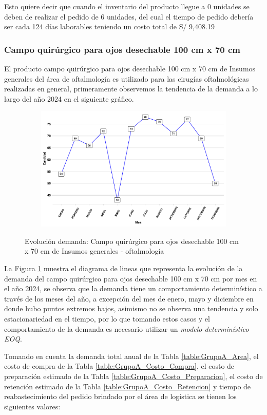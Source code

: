 Esto quiere decir que cuando el inventario del producto llegue a 0 unidades se deben de realizar el pedido de 6 unidades, del cual el tiempo de pedido debería ser cada 124 días laborables teniendo un costo total de S/ 9,408.19
\subsubsection{Campo quirúrgico para ojos desechable 100 cm x 70 cm}
El producto campo quirúrgico para ojos desechable 100 cm x 70 cm de Insumos generales del área de oftalmología es utilizado para las cirugías oftalmológicas realizadas en general, primeramente observemos la tendencia de la demanda a lo largo del año 2024 en el siguiente gráfico.

\begin{figure}[H]
  \caption{Evolución demanda: Campo quirúrgico para ojos desechable 100 cm x 70 cm de Insumos generales - oftalmología}
  {\includegraphics[width=15cm, height=5.95cm]{images/PROD011_demanda.pdf}}
  \label{fig:PROD011_demanda}
\end{figure}

La Figura \ref{fig:PROD011_demanda} muestra el diagrama de lineas que representa la evolución de la demanda del campo quirúrgico para ojos desechable 100 cm x 70 cm por mes en el año 2024, se observa que la demanda tiene un comportamiento determinístico a través de los meses del año, a excepción del mes de enero, mayo y diciembre en donde hubo puntos extremos bajos, asimismo no se observa una tendencia y solo estacionariedad en el tiempo, por lo que tomando estos casos y el comportamiento de la demanda es necesario utilizar un \textsl{modelo determinístico EOQ}.

Tomando en cuenta la demanda total anual de la Tabla \ref{table:GrupoA_Area}, el costo de compra de la Tabla \ref{table:GrupoA_Costo_Compra}, el costo de preparación estimado de la Tabla \ref{table:GrupoA_Costo_Preparacion}, el costo de retención estimado de la Tabla \ref{table:GrupoA_Costo_Retencion} y tiempo de reabastecimiento del pedido brindado por el área de logística se tienen los siguientes valores:

